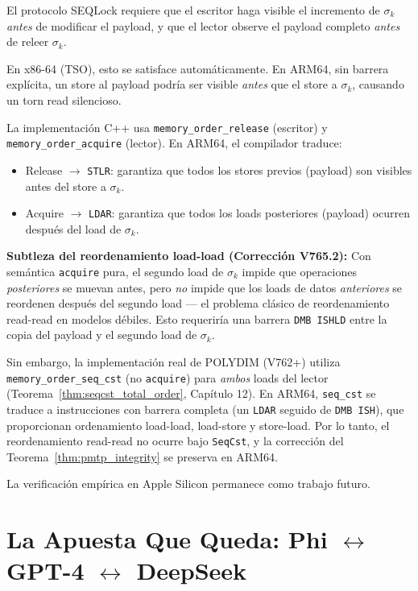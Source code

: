 \begin{remark}

El protocolo SEQLock requiere que el escritor haga visible el incremento
de $\sigma_k$ \emph{antes} de modificar el payload, y que el lector
observe el payload completo \emph{antes} de releer $\sigma_k$.

En x86-64 (TSO), esto se satisface automáticamente. En ARM64, sin barrera
explícita, un store al payload podría ser visible \emph{antes} que el store
a $\sigma_k$, causando un torn read silencioso.

La implementación C++ usa \texttt{memory\_order\_release} (escritor) y
\texttt{memory\_order\_acquire} (lector). En ARM64, el compilador traduce:
\begin{itemize}
    \item Release $\to$ \texttt{STLR}: garantiza que todos los stores 
    previos (payload) son visibles antes del store a $\sigma_k$.
    \item Acquire $\to$ \texttt{LDAR}: garantiza que todos los loads 
    posteriores (payload) ocurren después del load de $\sigma_k$.
\end{itemize}

\textbf{Subtleza del reordenamiento load-load (Corrección V765.2):}
Con semántica \texttt{acquire} pura, el segundo load de $\sigma_k$ 
impide que operaciones \emph{posteriores} se muevan antes, pero 
\emph{no} impide que los loads de datos \emph{anteriores} se 
reordenen después del segundo load --- el problema clásico de 
reordenamiento read-read en modelos débiles. Esto requeriría una
barrera \texttt{DMB ISHLD} entre la copia del payload y el 
segundo load de $\sigma_k$.

Sin embargo, la implementación real de POLYDIM (V762+) utiliza
\texttt{memory\_order\_seq\_cst} (no \texttt{acquire}) para 
\emph{ambos} loads del lector 
(Teorema~\ref{thm:seqcst_total_order}, Capítulo 12). En ARM64,
\texttt{seq\_cst} se traduce a instrucciones con barrera completa 
(un \texttt{LDAR} seguido de \texttt{DMB ISH}), que proporcionan 
ordenamiento load-load, load-store y store-load. Por lo tanto, el 
reordenamiento read-read no ocurre bajo \texttt{SeqCst}, y la 
corrección del Teorema~\ref{thm:pmtp_integrity} se preserva en ARM64.

La verificación empírica en Apple Silicon permanece como trabajo futuro.
\end{remark}

\section{La Apuesta Que Queda: Phi $\leftrightarrow$ GPT-4 $\leftrightarrow$ DeepSeek}

